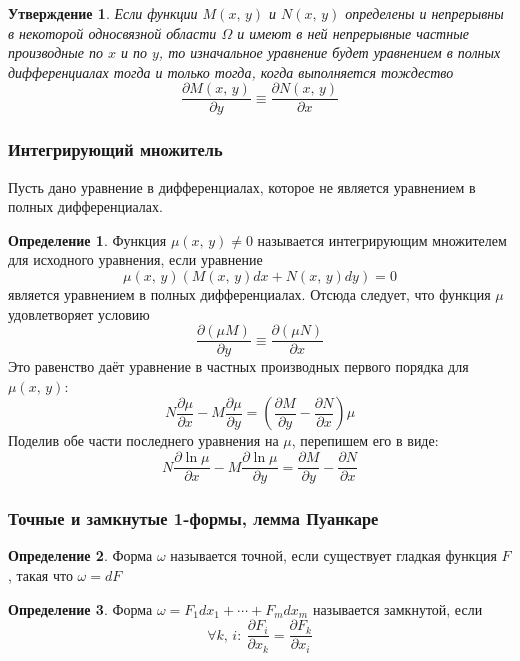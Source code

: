 \documentclass[a4paper,12pt]{article}
\theoremstyle{plain}
\newtheorem{proposition}{Утверждение}[section]
\theoremstyle{definition}
\newtheorem{definition}{Определение}[section]
\theoremstyle{remark}
\begin{document}
\begin{proposition}
	Если функции $M(x,\,y)$ и $N(x,\,y)$ определены и непрерывны в некоторой односвязной области $\Omega$ и имеют в ней непрерывные частные производные по $x$ и по $y$, то изначальное уравнение будет уравнением в полных дифференциалах тогда и только тогда, когда выполняется тождество
	\[\frac{\partial M(x,\,y)}{\partial y} \equiv \frac{\partial N(x,\,y)}{\partial x}\]
\end{proposition}

\subsubsection*{Интегрирующий множитель}
Пусть дано уравнение в дифференциалах, которое не является уравнением в полных дифференциалах.

\begin{definition}
	Функция $\mu(x,\,y) \neq 0$ называется интегрирующим множителем для исходного уравнения, если уравнение
	\[\mu(x,\,y)(M(x,\,y)dx + N(x,\,y)dy) = 0\]
	является уравнением в полных дифференциалах. Отсюда следует, что функция $\mu$ удовлетворяет условию
	\[\frac{\partial(\mu M)}{\partial y} \equiv \frac{\partial(\mu N)}{\partial x}\]
	Это равенство даёт уравнение в частных производных первого порядка для $\mu(x,\,y):$
	\[N\frac{\partial\mu}{\partial x} - M\frac{\partial\mu}{\partial y} = \left(\frac{\partial M}{\partial y} - \frac{\partial N}{\partial x}\right)\mu\]
	Поделив обе части последнего уравнения на $\mu$, перепишем его в виде:
	\[N\frac{\partial \ln\mu}{\partial x} - M\frac{\partial \ln\mu}{\partial y} = \frac{\partial M}{\partial y} - \frac{\partial N}{\partial x}\]
\end{definition}

\subsubsection*{Точные и замкнутые 1-формы, лемма Пуанкаре}
\begin{definition}
	Форма $\omega$ называется точной, если существует гладкая функция $F$, такая что $\omega = dF$
\end{definition}

\begin{definition}
	Форма $\omega = F_1dx_1 + \cdots + F_mdx_m$ называется замкнутой, если
	\[\forall k,\,i:\: \frac{\partial F_i}{\partial x_k} = \frac{\partial F_k}{\partial x_i}\]
\end{definition}
\end{document}
